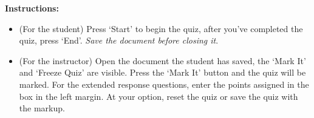 \documentclass{article}
\begin{document}
\thQuizHeader

\noindent\textbf{Instructions:}
\begin{itemize}
\item (For the student) Press `\textsf{Start}' to begin the
    quiz, after you've completed the quiz, press
    `\textsf{End}'. \emph{Save the document before closing
    it}.
\item (For the instructor) Open the document the student has
    saved, the `\textsf{Mark It}' and `\textsf{Freeze Quiz}'
    are visible. Press the `\textsf{Mark It}' button and the
    quiz will be marked. For the extended response questions,
    enter the points assigned in the box in the left margin.
    At your option, reset the quiz or save the quiz with the
    markup.
\end{itemize}
\end{document}
